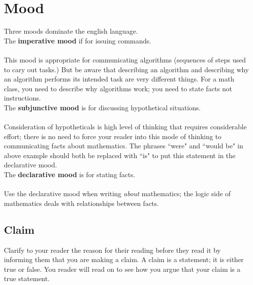 \documentclass[12pt]{article}
\def\noi{\noindent}
\def\thup{\rightthumbsup}
\def\thdn{\rightthumbsdown}
\begin{document}
\section{ Mood}
Three moods dominate the english language. \\

\noi The {\bf imperative mood} if for issuing commands.\\[.2cm]
\thdn \\
This mood is appropriate for communicating  algorithms (sequences of steps used to cary out tasks.) But be aware that  describing an algorithm and describing why an algorithm performs its intended task are very different things. For a math class, you need to describe why algorithms work; you need to state facts not instructions.\\


\noi The {\bf subjunctive mood} is for discussing hypothetical situations.\\[.2cm]
\thdn \\[.2cm]
Consideration of hypotheticals  is high level of thinking that requires considerable effort; there is no need to force your reader into this mode of thinking to communicating facts about mathematics.  
The phrases ``were" and ``would be" in above example should both be replaced with ``is" to put this statement in the declarative mood.\\

\noi The {\bf declarative mood} is for stating facts.\\[.2cm]
 \thup\\

Use the declarative mood when writing {\it about} mathematics; the logic side of mathematics deals with relationships between facts.





\subsection{Claim}
Clarify to your reader the reason for their reading before they read it by informing them that you are making a claim. %
A claim is a statement; it is either true or false. 
You reader will read on to see how you argue that your claim is a true statement. 
\end{document}
